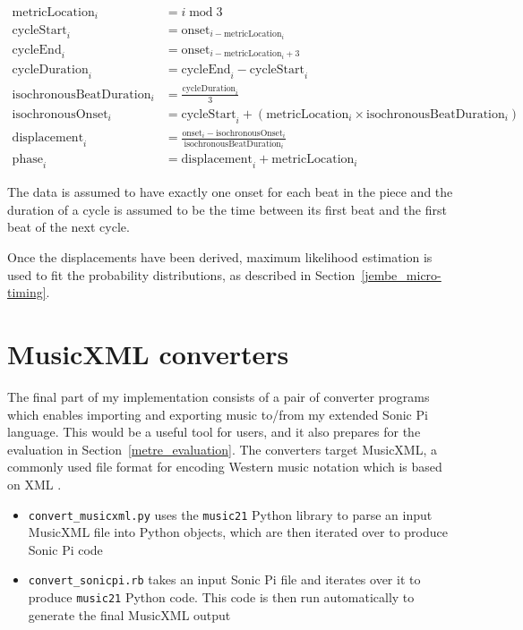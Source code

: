 \documentclass[12pt,twoside,openright]{report}
\begin{document}
\begin{equation}
\begin{split}
    \mathrm{metricLocation}_i &= i \;\mathrm{mod}\; 3 \\
    \mathrm{cycleStart}_i     &= \mathrm{onset}_{i-\mathrm{metricLocation}_i} \\
    \mathrm{cycleEnd}_i       &= \mathrm{onset}_{i-\mathrm{metricLocation}_i+3} \\
    \mathrm{cycleDuration}_i  &= \mathrm{cycleEnd}_i - \mathrm{cycleStart}_i \\
    \mathrm{isochronousBeatDuration}_i &= \frac{\mathrm{cycleDuration}_i}{3} \\
    \mathrm{isochronousOnset}_i &= \mathrm{cycleStart}_i + (\mathrm{metricLocation}_i \times \mathrm{isochronousBeatDuration}_i) \\
    \mathrm{displacement}_i &= \frac{\mathrm{onset}_i-\mathrm{isochronousOnset}_i}{\mathrm{isochronousBeatDuration}_i} \\
    \mathrm{phase}_i          &= \mathrm{displacement}_i + \mathrm{metricLocation}_i
\end{split}
\label{eq:displacement_from_onset}
\end{equation}

The data is assumed to have exactly one onset for each beat in the piece and the
duration of a cycle is assumed to be the time between its first beat and the
first beat of the next cycle.

Once the displacements have been derived, maximum
likelihood estimation is used to fit the probability distributions, as described in
Section~\ref{jembe_micro-timing}.
\newpage



\section{MusicXML converters} \label{musicxml_converters}

The final part of my implementation consists of a pair of converter programs which enables importing and exporting music to/from my extended Sonic Pi language. This would be a useful tool for users, and it also prepares for the evaluation in Section~\ref{metre_evaluation}. The converters target MusicXML, a commonly used file format for encoding Western music notation which is based on XML \cite{good2001}.

\begin{itemize}
	\item \verb'convert_musicxml.py' uses the \verb'music21' Python library to parse an input MusicXML file into Python objects, which are then iterated over to produce Sonic Pi code
	\item \verb'convert_sonicpi.rb' takes an input Sonic Pi file and iterates over it to produce \verb'music21' Python code. This code is then run automatically to generate the final MusicXML output
\end{itemize}
\end{document}
